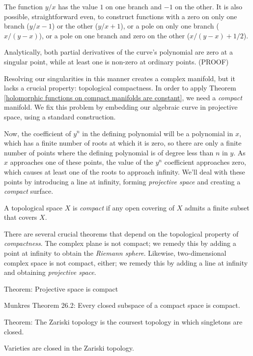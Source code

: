 
The function $y/x$ has the value $1$ on one branch and $-1$
on the other.  It is also possible, straightforward even, to construct functions
with a zero on only one branch ($y/x - 1$) or the other
($y/x + 1$), or a pole on only one branch ($x/(y-x)$),
or a pole on one branch and zero on the other ($x/(y-x) + 1/2$).
\endexample


Analytically, both partial derivatives of the curve's polynomial are
zero at a singular point, while at least one is non-zero at ordinary
points. (PROOF)



Resolving our singularities in this manner creates a complex
manifold, but it lacks a crucial property: topological compactness.
In order to apply Theorem \ref{holomorphic functions on compact
manifolds are constant}, we need a {\it compact} manifold.
We fix this problem by embedding our algebraic curve
in projective space, using a standard construction.


Now, the coefficient of $y^n$ in the defining polynomial will be a
polynomial in $x$, which has a finite number of roots at which it is
zero, so there are only a finite number of points where the defining
polynomial is of degree less than $n$ in $y$.  As $x$ approaches one
of these points, the value of the $y^n$ coefficient approaches zero,
which causes at least one of the roots to approach infinity.  We'll
deal with these points by introducing a line at infinity, forming
{\it projective space} and creating a {\it compact} surface.

A topological space $X$ is {\it compact} if any open covering
of $X$ admits a finite subset that covers $X$.
\enddefinition

There are several crucial theorems that depend on the topological
property of {\it compactness}.  The complex plane is not compact; we
remedy this by adding a point at infinity to obtain the {\it Riemann
sphere}.  Likewise, two-dimensional complex space is not compact,
either; we remedy this by adding a line at infinity and obtaining {\it
projective space}.

Theorem: Projective space is compact

Munkres Theorem 26.2: Every closed subspace of a compact space is compact.

Theorem: The Zariski topology is the coursest topology in which
singletons are closed.

Varieties are closed in the Zariski topology.

